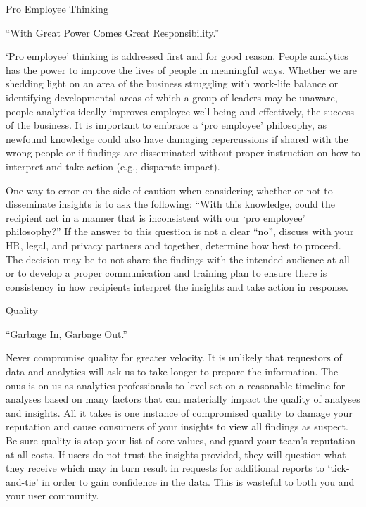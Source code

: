 \documentclass[]{book}
\begin{document}
 Pro Employee Thinking

``With Great Power Comes Great Responsibility.''

`Pro employee' thinking is addressed first and for good reason. People analytics has the power to improve the lives of people in meaningful ways. Whether we are shedding light on an area of the business struggling with work-life balance or identifying developmental areas of which a group of leaders may be unaware, people analytics ideally improves employee well-being and effectively, the success of the business. It is important to embrace a `pro employee' philosophy, as newfound knowledge could also have damaging repercussions if shared with the wrong people or if findings are disseminated without proper instruction on how to interpret and take action (e.g., disparate impact).

One way to error on the side of caution when considering whether or not to disseminate insights is to ask the following: ``With this knowledge, could the recipient act in a manner that is inconsistent with our `pro employee' philosophy?'' If the answer to this question is not a clear ``no'', discuss with your HR, legal, and privacy partners and together, determine how best to proceed. The decision may be to not share the findings with the intended audience at all or to develop a proper communication and training plan to ensure there is consistency in how recipients interpret the insights and take action in response.

 Quality

``Garbage In, Garbage Out.''

Never compromise quality for greater velocity. It is unlikely that requestors of data and analytics will ask us to take longer to prepare the information. The onus is on us as analytics professionals to level set on a reasonable timeline for analyses based on many factors that can materially impact the quality of analyses and insights. All it takes is one instance of compromised quality to damage your reputation and cause consumers of your insights to view all findings as suspect. Be sure quality is atop your list of core values, and guard your team's reputation at all costs. If users do not trust the insights provided, they will question what they receive which may in turn result in requests for additional reports to `tick-and-tie' in order to gain confidence in the data. This is wasteful to both you and your user community.
\end{document}
